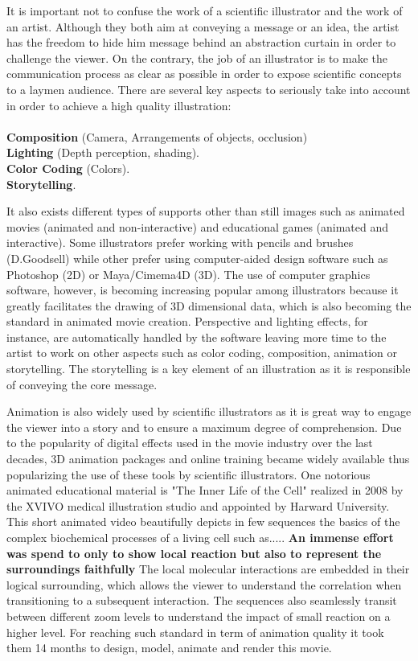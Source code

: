 It is important not to confuse the work of a scientific illustrator and the work of an artist.
Although they both aim at conveying a message or an idea, the artist has the freedom to hide him message behind an abstraction curtain in order to challenge the viewer.
On the contrary, the job of an illustrator is to make the communication process as clear as possible in order to expose scientific concepts to a laymen audience.
There are several key aspects to seriously take into account in order to achieve a high quality illustration:
\\
\\ \textbf{Composition} (Camera, Arrangements of objects, occlusion)
\\ \textbf{Lighting} (Depth perception, shading).
\\ \textbf{Color Coding} (Colors).
\\ \textbf{Storytelling}.

It also exists different types of supports other than still images such as animated movies (animated and non-interactive) and educational games (animated and interactive).
Some illustrators prefer working with pencils and brushes (D.Goodsell) while other prefer using computer-aided design software such as Photoshop (2D) or Maya/Cimema4D (3D).
The use of computer graphics software, however, is becoming increasing popular among illustrators because it greatly facilitates the drawing of 3D dimensional data, which is also becoming the standard in animated movie creation.
Perspective and lighting effects, for instance, are automatically handled by the software leaving more time to the artist to work on other aspects such as color coding, composition, animation or storytelling.
The storytelling is a key element of an illustration as it is responsible of conveying the core message.

Animation is also widely used by scientific illustrators as it is great way to engage the viewer into a story and to ensure a maximum degree of comprehension.
Due to the popularity of digital effects used in the movie industry over the last decades, 3D animation packages and online training became widely available thus popularizing the use of these tools by scientific illustrators.
One notorious animated educational material is "The Inner Life of the Cell" realized in 2008 by the XVIVO medical illustration studio and appointed by Harward University.
This short animated video beautifully depicts in few sequences the basics of the complex biochemical processes of a living cell such as.....
\textbf{An immense effort was spend to only to show local reaction but also to represent the surroundings faithfully}
The local molecular interactions are embedded in their logical surrounding, which allows the viewer to understand the correlation when transitioning to a subsequent interaction.
The sequences also seamlessly transit between different zoom levels to understand the impact of small reaction on a higher level.
For reaching such standard in term of animation quality it took them 14 months to design, model, animate and render this movie.

